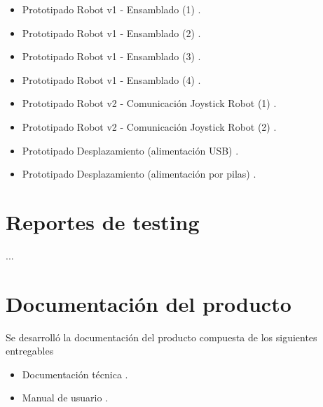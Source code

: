 \begin{itemize}
	\item Prototipado Robot v1 - Ensamblado (1) \cite{Prototipado_Ensamblado_1}.	
	\item Prototipado Robot v1 - Ensamblado (2) \cite{Prototipado_Ensamblado_2}.
	\item Prototipado Robot v1 - Ensamblado (3) \cite{Prototipado_Ensamblado_3}.
	\item Prototipado Robot v1 - Ensamblado (4) \cite{Prototipado_Ensamblado_4}.
	\item Prototipado Robot v2 - Comunicación Joystick Robot (1) \cite{Prototipado_Comunicacion_JoystickRobot1}.
	\item Prototipado Robot v2 - Comunicación Joystick Robot (2) \cite{Prototipado_Comunicacion_JoystickRobot2}.
	\item Prototipado Desplazamiento (alimentación USB) \cite{Prototipado_Desplazamiento_USB}.
	\item Prototipado Desplazamiento (alimentación por pilas) \cite{Prototipado_Desplazamiento_Pilas}.

\end{itemize}


\section{Reportes de testing}

...


\section{Documentación del producto }

Se desarrolló la documentación del producto compuesta de los siguientes entregables
\begin{itemize}
	\item Documentación técnica \cite{Robot_Tecnical_doc}.
	\item Manual de usuario \cite{Robot_User_manual}.
\end{itemize}











